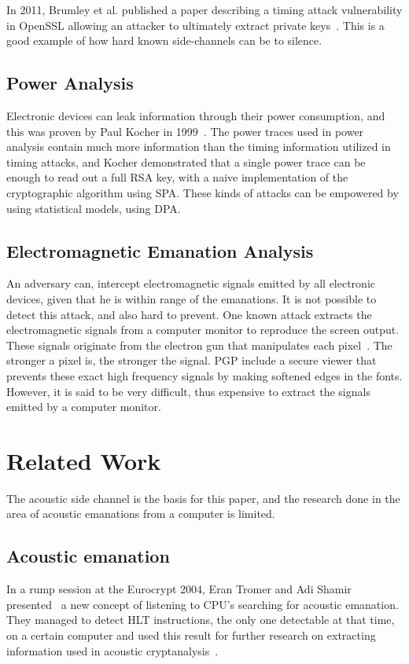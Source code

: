 In 2011, Brumley et al. published a paper describing a timing attack vulnerability in OpenSSL allowing an attacker to ultimately extract private keys~\cite{DBLP:conf/esorics/BrumleyT11}.
This is a good example of how hard known side-channels can be to silence.


\subsection{Power Analysis}\label{chp2:subsec:power_analysis}
Electronic devices can leak information through their power consumption, and this was proven by Paul Kocher in 1999~\cite{DBLP:conf/crypto/KocherJJ99}.
The power traces used in power analysis contain much more information than the timing information utilized in timing attacks, and Kocher demonstrated that a single power trace can be enough to read out a full RSA key, with a naive implementation of the cryptographic algorithm using \gls{SPA}.
These kinds of attacks can be empowered by using statistical models, using \gls{DPA}.


\subsection{Electromagnetic Emanation Analysis}\label{chp2:subsec:electromagnetic_attacks}
An adversary can, intercept electromagnetic signals emitted by all electronic devices, given that he is within range of the emanations. 
It is not possible to detect this attack, and also hard to prevent.
One known attack extracts the electromagnetic signals from a computer monitor to reproduce the screen output.
These signals originate from the electron gun that manipulates each pixel~\cite{url:tempest_sans}. 
The stronger a pixel is, the stronger the signal.
\gls{PGP} include a secure viewer that prevents these exact high frequency signals by making softened edges in the fonts.
However, it is said to be very difficult, thus expensive to extract the signals emitted by a computer monitor.


\section{Related Work}\label{chp2:sec:related_work}
The acoustic side channel is the basis for this paper, and the research done in the area of acoustic emanations from a computer is limited.

\subsection{Acoustic emanation}
In a rump session at the Eurocrypt 2004, Eran Tromer and Adi Shamir presented~\cite{tromer2004acoustic} a new concept of listening to CPU's searching for acoustic emanation. 
They managed to detect HLT instructions, the only one detectable at that time, on a certain computer and used this result for further research on extracting information used in acoustic cryptanalysis~\cite{tromer2007hardware}.

